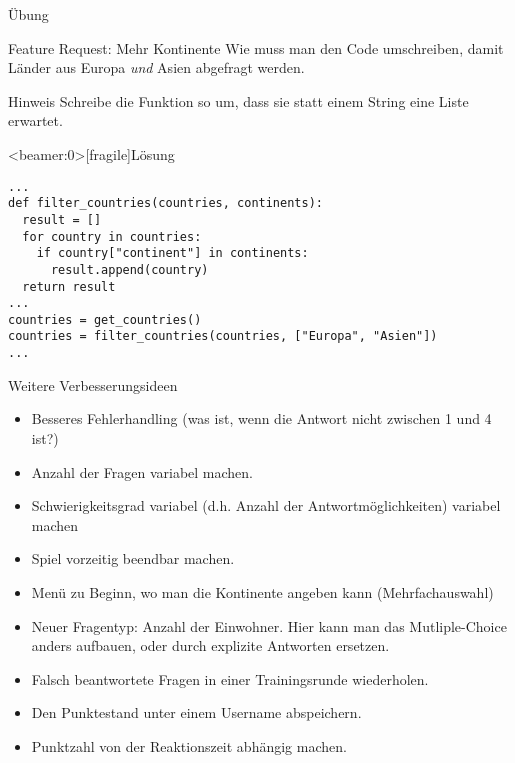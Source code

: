 \begin{frame}{Übung}
\begin{block}{Feature Request: Mehr Kontinente}
\vspace{2pt}
Wie muss man den Code umschreiben, damit Länder aus Europa \emph{und} Asien abgefragt werden.
\end{block}


\pause

\vspace{12pt}

\begin{exampleblock}{Hinweis}
	\vspace{2pt}
Schreibe die Funktion  so um, dass sie statt einem String  eine Liste  erwartet. 
\end{exampleblock}

\end{frame}

\begin{frame}<beamer:0>[fragile]{Lösung}
	
\begin{solutionblock}{}
\begin{verbatim}
...
def filter_countries(countries, continents):
  result = []
  for country in countries:
    if country["continent"] in continents:
      result.append(country)
  return result
...
countries = get_countries()
countries = filter_countries(countries, ["Europa", "Asien"])
...
\end{verbatim}
\end{solutionblock}
\end{frame}


\begin{frame}
\begin{block}{Weitere Verbesserungsideen}
	\pause 
\begin{itemize}[<+->]
  \item Besseres Fehlerhandling (was ist, wenn die Antwort nicht zwischen 1 und 4 ist?)
  \item Anzahl der Fragen variabel machen. 
  \item Schwierigkeitsgrad variabel (d.h. Anzahl der Antwortmöglichkeiten) variabel machen
  \item Spiel vorzeitig beendbar machen. 
  \item Menü zu Beginn, wo man die Kontinente angeben kann (Mehrfachauswahl)
  \item Neuer Fragentyp: Anzahl der Einwohner. Hier kann man das Mutliple-Choice anders aufbauen, oder durch explizite Antworten ersetzen. 
  \item Falsch beantwortete Fragen in einer Trainingsrunde wiederholen.  
  \item Den Punktestand unter einem Username abspeichern.
  \item Punktzahl von der Reaktionszeit abhängig machen. 
\end{itemize}
\end{block}
\end{frame}